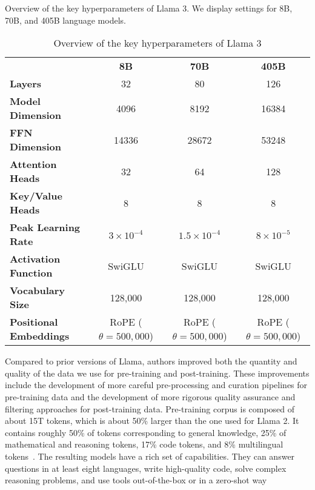 \begin{table}[h!]
	\centering
	\caption{Overview of the key hyperparameters of Llama 3. We display settings for 8B, 70B, and 405B language models.}
	\begin{tabularx}{\textwidth}{Xccc}
		\textbf{}                      & \textbf{8B}               & \textbf{70B}              & \textbf{405B}             \\
		\textbf{Layers}                & 32                        & 80                        & 126                       \\
		\textbf{Model Dimension}       & 4096                      & 8192                      & 16384                     \\
		\textbf{FFN Dimension}         & 14336                     & 28672                     & 53248                     \\
		\textbf{Attention Heads}       & 32                        & 64                        & 128                       \\
		\textbf{Key/Value Heads}       & 8                         & 8                         & 8                         \\
		\textbf{Peak Learning Rate}    & $3 \times 10^{-4}$        & $1.5 \times 10^{-4}$      & $8 \times 10^{-5}$        \\
		\textbf{Activation Function}   & SwiGLU                    & SwiGLU                    & SwiGLU                    \\
		\textbf{Vocabulary Size}       & 128,000                   & 128,000                   & 128,000                   \\
		\textbf{Positional Embeddings} & RoPE ($\theta = 500,000$) & RoPE ($\theta = 500,000$) & RoPE ($\theta = 500,000$) \\
		\hline
	\end{tabularx}
	\caption{Overview of the key hyperparameters of Llama 3}
	\label{tab:llama3-hyperparameters}
\end{table}

Compared to prior versions of Llama, authors improved both the quantity and quality of the data we use for pre-training and post-training.
These improvements include the development of more careful pre-processing and curation pipelines for pre-training data and the development of more rigorous quality assurance and filtering approaches for post-training data.
Pre-training corpus is composed of about 15T tokens, which is about 50\% larger than the one used for Llama 2.
It contains roughly 50\% of tokens corresponding to general knowledge, 25\% of mathematical and reasoning tokens, 17\% code tokens, and 8\% multilingual tokens~\cite{llama3}.
The resulting models have a rich set of capabilities.
They can answer questions in at least eight languages, write high-quality code, solve complex reasoning problems, and use tools out-of-the-box or in a zero-shot way


